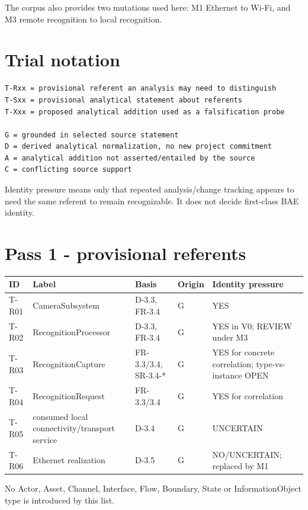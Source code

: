 \documentclass[10pt,a4paper]{article}
\begin{document}
The corpus also provides two mutations used here: M1 Ethernet to Wi-Fi, and M3 remote recognition to local recognition.

\section{Trial notation}
\begin{lstlisting}
T-Rxx = provisional referent an analysis may need to distinguish
T-Sxx = provisional analytical statement about referents
T-Xxx = proposed analytical addition used as a falsification probe

G = grounded in selected source statement
D = derived analytical normalization, no new project commitment
A = analytical addition not asserted/entailed by the source
C = conflicting source support
\end{lstlisting}

Identity pressure means only that repeated analysis/change tracking appears to need the same referent to remain recognizable. It does not decide first-class BAE identity.

\section{Pass 1 - provisional referents}
\small
\begin{longtable}{p{}p{}p{}p{}p{}}
\toprule
\textbf{ID} & \textbf{Label} & \textbf{Basis} & \textbf{Origin} & \textbf{Identity pressure}\\
\midrule\endhead
T-R01 & CameraSubsystem & D-3.3, FR-3.4 & G & YES\\
T-R02 & RecognitionProcessor & D-3.3, FR-3.4 & G & YES in V0; REVIEW under M3\\
T-R03 & RecognitionCapture & FR-3.3/3.4, SR-3.4-* & G & YES for concrete correlation; type-vs-instance OPEN\\
T-R04 & RecognitionRequest & FR-3.3/3.4 & G & YES for correlation\\
T-R05 & consumed local connectivity/transport service & D-3.4 & G & UNCERTAIN\\
T-R06 & Ethernet realization & D-3.5 & G & NO/UNCERTAIN; replaced by M1\\
\bottomrule
\end{longtable}
\normalsize

No Actor, Asset, Channel, Interface, Flow, Boundary, State or InformationObject type is introduced by this list.
\end{document}
